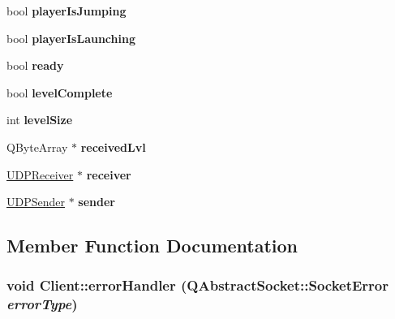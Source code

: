 \begin{DoxyCompactItemize}
\item 
\hypertarget{classClient_af9490f768c7de73ecd79670679fe455f}{
bool {\bfseries playerIsJumping}}
\label{classClient_af9490f768c7de73ecd79670679fe455f}

\item 
\hypertarget{classClient_ac4212d917f635db9b85b82c41638e7d7}{
bool {\bfseries playerIsLaunching}}
\label{classClient_ac4212d917f635db9b85b82c41638e7d7}

\item 
\hypertarget{classClient_aa8dfba5edb20c1525af9467122de2162}{
bool {\bfseries ready}}
\label{classClient_aa8dfba5edb20c1525af9467122de2162}

\item 
\hypertarget{classClient_acc3630c0a1e8252531b7afbf3e58e719}{
bool {\bfseries levelComplete}}
\label{classClient_acc3630c0a1e8252531b7afbf3e58e719}

\item 
\hypertarget{classClient_a0c4371e6cc3ab92e6c0d621afa6d9db1}{
int {\bfseries levelSize}}
\label{classClient_a0c4371e6cc3ab92e6c0d621afa6d9db1}

\item 
\hypertarget{classClient_a9b867f1ec4c4ddc68babd7f74635deab}{
QByteArray $\ast$ {\bfseries receivedLvl}}
\label{classClient_a9b867f1ec4c4ddc68babd7f74635deab}

\item 
\hypertarget{classClient_aa156feda3cb5f054a47c7e258b249630}{
\hyperlink{classUDPReceiver}{UDPReceiver} $\ast$ {\bfseries receiver}}
\label{classClient_aa156feda3cb5f054a47c7e258b249630}

\item 
\hypertarget{classClient_aac0edbbfb747fb7a7ce528354a8e43d5}{
\hyperlink{classUDPSender}{UDPSender} $\ast$ {\bfseries sender}}
\label{classClient_aac0edbbfb747fb7a7ce528354a8e43d5}

\end{DoxyCompactItemize}


\subsection{Member Function Documentation}
\hypertarget{classClient_a97e3cafa32f18b690d47046d0b0e5b0d}{
\subsubsection[{errorHandler}]{\setlength{\rightskip}{0pt plus 5cm}void Client::errorHandler (QAbstractSocket::SocketError {\em errorType})}}
\label{classClient_a97e3cafa32f18b690d47046d0b0e5b0d}


